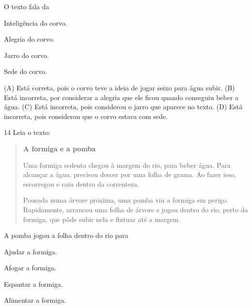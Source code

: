 
O texto fala da

\begin{escolha}
\item Inteligência do corvo.

\item Alegria do corvo.

\item Jarro do corvo.

\item Sede do corvo.
\end{escolha}


(A) Está correta, pois o corvo teve a ideia de jogar seixo para água subir.
(B) Está incorreta, por considerar a alegria que ele ficou quando
conseguiu beber a água.
(C) Está incorreta, pois considerou o jarro que aparece no texto.
(D) Está incorreta, pois considerou que o corvo estava com sede.

\num{14} Leia o texto:

\begin{quote}
\textbf{A formiga e a pomba}

Uma formiga sedenta chegou à margem do rio, para beber
água. Para alcançar a água, precisou descer por uma folha de
grama. Ao fazer isso, escorregou e caiu dentro da correnteza.

Pousada numa árvore próxima, uma pomba viu a
formiga em perigo. Rapidamente, arrancou uma folha de
árvore e jogou dentro do rio, perto da formiga, que pôde subir
nela e flutuar até a margem.
\end{quote}


A pomba jogou a folha dentro do rio para

\begin{escolha}
\item Ajudar a formiga.

\item Afogar a formiga.

\item Espantar a formiga.

\item Alimentar a formiga.
\end{escolha}

